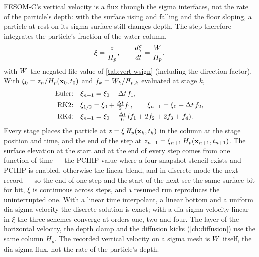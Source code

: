 FESOM-C's vertical velocity is a flux through the sigma interfaces, not the rate of the particle's
depth: with the surface rising and falling and the floor sloping, a particle at rest on its sigma
surface still changes depth. The step therefore integrates the particle's fraction of the water column,
\begin{equation}\label{eq:vert-sigma-ode}
  \xi = \frac{z}{H_p}, \qquad \frac{d\xi}{dt}=\frac{W}{H_p},
\end{equation}
with $W$ the negated file value of \cref{tab:vert-wsign} (including the direction factor). With
$\xi_0=z_n/H_p(\mathbf{x}_0,t_0)$ and $f_k=W_k/H_{p,k}$ evaluated at stage $k$,
\begin{align}
  \text{Euler:}\quad & \xi_{n+1}=\xi_0+\Delta t\,f_1, \label{eq:vert-sigma-euler}\\
  \text{RK2:}\quad & \xi_{1/2}=\xi_0+\tfrac{\Delta t}{2}f_1,\qquad \xi_{n+1}=\xi_0+\Delta t\,f_2, \label{eq:vert-sigma-rk2}\\
  \text{RK4:}\quad & \xi_{n+1}=\xi_0+\tfrac{\Delta t}{6}\,(f_1+2f_2+2f_3+f_4). \label{eq:vert-sigma-rk4}
\end{align}
Every stage places the particle at $z=\xi\,H_p(\mathbf{x}_k,t_k)$ in the column at the stage position
and time, and the end of the step at $z_{n+1}=\xi_{n+1}\,H_p(\mathbf{x}_{n+1},t_{n+1})$. The surface
elevation at the start and at the end of every step comes from one function of time --- the PCHIP
value where a four-snapshot stencil exists and PCHIP is enabled, otherwise the linear blend, and in
discrete mode the next record --- so the end of one step and the start of the next see the same surface
bit for bit, $\xi$ is continuous across steps, and a resumed run reproduces the uninterrupted one. With a
linear time interpolant, a linear bottom and a uniform dia-sigma velocity the discrete solution is
exact; with a dia-sigma velocity linear in $\xi$ the three schemes converge at orders one, two and four.
The layer of the horizontal velocity, the depth clamp and the diffusion kicks (\cref{ch:diffusion}) use
the same column $H_p$. The recorded vertical velocity on a sigma mesh is $W$ itself, the dia-sigma
flux, not the rate of the particle's depth.


